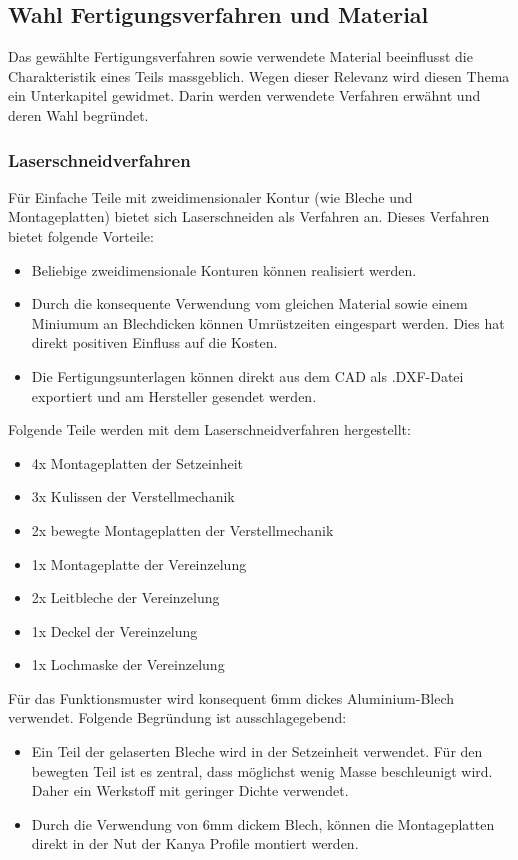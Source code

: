 \subsection{Wahl Fertigungsverfahren und Material}
Das gewählte Fertigungsverfahren sowie verwendete Material beeinflusst die Charakteristik eines Teils massgeblich. Wegen dieser Relevanz wird diesen Thema ein Unterkapitel gewidmet. Darin werden verwendete Verfahren erwähnt und deren Wahl begründet.

\subsubsection{Laserschneidverfahren}
Für Einfache Teile mit zweidimensionaler Kontur (wie Bleche und Montageplatten) bietet sich Laserschneiden als Verfahren an. Dieses Verfahren bietet folgende Vorteile:

\begin{itemize}
	\item Beliebige zweidimensionale Konturen können realisiert werden.
	
	\item Durch die konsequente Verwendung vom gleichen Material sowie einem Miniumum an Blechdicken können Umrüstzeiten eingespart werden. Dies hat direkt positiven Einfluss auf die Kosten.
	
	\item Die Fertigungsunterlagen können direkt aus dem CAD als .DXF-Datei exportiert und am Hersteller gesendet werden. 
\end{itemize}
Folgende Teile werden mit dem Laserschneidverfahren hergestellt:
\begin{itemize}
	\item 4x Montageplatten der Setzeinheit
	\item 3x Kulissen der Verstellmechanik
	\item 2x bewegte Montageplatten der Verstellmechanik
	\item 1x Montageplatte der Vereinzelung
	\item 2x Leitbleche der Vereinzelung
	\item 1x Deckel der Vereinzelung
	\item 1x Lochmaske der Vereinzelung
\end{itemize}
Für das Funktionsmuster wird konsequent 6mm dickes Aluminium-Blech verwendet. Folgende Begründung ist ausschlagegebend:

\begin{itemize}
	\item Ein Teil der gelaserten Bleche wird in der Setzeinheit verwendet. Für den bewegten Teil ist es zentral, dass möglichst wenig Masse beschleunigt wird. Daher ein Werkstoff mit geringer Dichte verwendet.
	
	\item Durch die Verwendung von 6mm dickem Blech, können die Montageplatten direkt in der Nut der Kanya Profile montiert werden.
\end{itemize}

